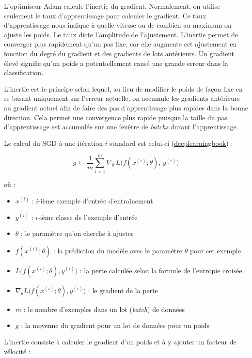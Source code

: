 \documentclass{article}
\begin{document}
L'optimiseur Adam calcule l'inertie du gradient. Normalement, on utilise seulement le taux d'apprentissage pour calculer le gradient. Ce taux d'apprentissage nous indique à quelle vitesse ou de combien au maximum on ajuste les poids. Le taux dicte l’amplitude de l’ajustement. L’inertie permet de converger plus rapidement qu’un pas fixe, car elle augmente cet ajustement en fonction du degré du gradient et des gradients de lots antérieurs. Un gradient élevé signifie qu’un poids a potentiellement causé une grande erreur dans la classification.

L’inertie est le principe selon lequel, au lieu de modifier le poids de façon fixe en se basant uniquement sur l’erreur actuelle, on accumule les gradients antérieurs au gradient actuel afin de faire des pas d’apprentissage plus rapides dans la bonne direction. Cela permet une convergence plus rapide puisque la taille du pas d’apprentissage est accumulée sur une fenêtre de \emph{batchs} durant l’apprentissage. 

Le calcul du SGD à une itération $i$ standard est celui-ci (\href{https://www.deeplearningbook.org/contents/optimization.html}{deeplearningbook}) :

\[
g \leftarrow \frac{1}{m} \sum_{i=1}^m \nabla_\theta \, L\bigl(f(x^{(i)};\theta),\, y^{(i)}\bigr)
\]

où :
\begin{itemize}
    \item $x^{(i)}$ : $i$-ième exemple d’entrée d'entraînement
    \item $y^{(i)}$ : $i$-ième classe de l’exemple d’entrée
    \item $\theta$ : le paramètre qu’on cherche à ajuster
    \item $f(x^{(i)};\theta)$ : la prédiction du modèle avec le paramètre $\theta$ pour cet exemple
    \item $L\bigl(f(x^{(i)};\theta), y^{(i)}\bigr)$ : la perte calculée selon la formule de l’entropie croisée
    \item $\nabla_\theta L\bigl(f(x^{(i)};\theta), y^{(i)}\bigr)$ : le gradient de la perte
    \item $m$ : le nombre d’exemples dans un lot (\emph{batch}) de données
    \item $g$ : la moyenne du gradient pour un lot de données pour un poids
\end{itemize}

L’inertie consiste à calculer le gradient d’un poids et à y ajouter un facteur de vélocité :
\end{document}
